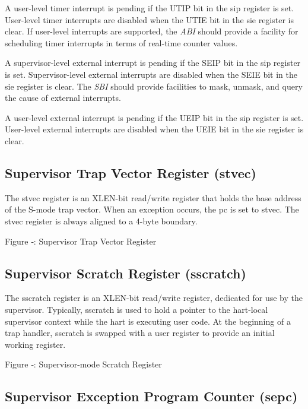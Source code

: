 A user-level timer interrupt is pending if the UTIP bit in the sip
register is set. User-level timer interrupts are disabled when the UTIE
bit in the sie register is clear. If user-level interrupts are
supported, the \emph{ABI} should provide a facility for scheduling timer
interrupts in terms of real-time counter values.

A supervisor-level external interrupt is pending if the SEIP bit in the
sip register is set. Supervisor-level external interrupts are disabled
when the SEIE bit in the sie register is clear. The \emph{SBI} should
provide facilities to mask, unmask, and query the cause of external
interrupts.

A user-level external interrupt is pending if the UEIP bit in the sip
register is set. User-level external interrupts are disabled when the
UEIE bit in the sie register is clear.

\subsection{Supervisor Trap Vector Register
(stvec)}\label{supervisor-trap-vector-register-stvec}

The stvec register is an XLEN-bit read/write register that holds the
base address of the S-mode trap vector. When an exception occurs, the pc
is set to stvec. The stvec register is always aligned to a 4-byte
boundary.

\missingfigure{}

Figure ‑: Supervisor Trap Vector Register

\subsection{Supervisor Scratch Register (sscratch)
}\label{supervisor-scratch-register-sscratch}

The sscratch register is an XLEN-bit read/write register, dedicated for
use by the supervisor. Typically, sscratch is used to hold a pointer to
the hart-local supervisor context while the hart is executing user code.
At the beginning of a trap handler, sscratch is swapped with a user
register to provide an initial working register.

\missingfigure{}

Figure ‑: Supervisor-mode Scratch Register

\subsection{Supervisor Exception Program Counter
(sepc)}\label{supervisor-exception-program-counter-sepc}

